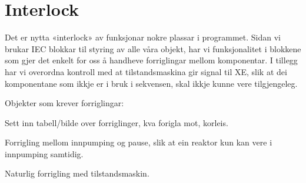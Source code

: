 \section{Interlock}
\thispagestyle{fancy}

Det er nytta «interlock» av funksjonar nokre plassar i programmet. 
Sidan vi brukar IEC blokkar til styring av alle våra objekt, har vi funksjonalitet i blokkene som gjer det enkelt for oss å handheve forriglingar mellom komponentar. I tillegg har vi overordna kontroll med at tilstandsmaskina gir signal til XE, slik at dei komponentane som ikkje er i bruk i sekvensen, skal ikkje kunne vere tilgjengeleg.

Objekter som krever forriglingar:

Sett inn tabell/bilde over forriglinger, kva forigla mot, korleis.

Forrigling mellom innpumping og pause, slik at ein reaktor kun kan vere i innpumping samtidig.

Naturlig forrigling med tilstandsmaskin.
